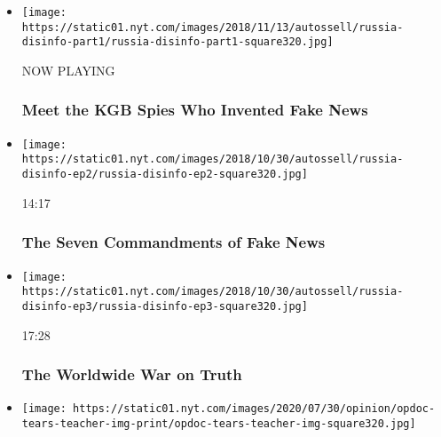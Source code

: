 \begin{itemize}
\item
  \texttt{[image: https://static01.nyt.com/images/2018/11/13/autossell/russia-disinfo-part1/russia-disinfo-part1-square320.jpg]}

  NOW PLAYING

  \hypertarget{meet-the-kgb-spies-who-invented-fake-news-2}{%
  \subsubsection{Meet the KGB Spies Who Invented Fake
  News}\label{meet-the-kgb-spies-who-invented-fake-news-2}}
\item
  \href{https://www.nytimes.com/video/opinion/100000006188102/what-is-pizzagate.html?action=click\&module=video-series-bar\&region=header\&pgtype=Article\&playlistId=video/opinion}{}

  \texttt{[image: https://static01.nyt.com/images/2018/10/30/autossell/russia-disinfo-ep2/russia-disinfo-ep2-square320.jpg]}

  14:17

  \hypertarget{the-seven-commandments-of-fake-news}{%
  \subsubsection{The Seven Commandments of Fake
  News}\label{the-seven-commandments-of-fake-news}}
\item
  \href{https://www.nytimes.com/video/opinion/100000006188105/countering-disinformation-active-measures.html?action=click\&module=video-series-bar\&region=header\&pgtype=Article\&playlistId=video/opinion}{}

  \texttt{[image: https://static01.nyt.com/images/2018/10/30/autossell/russia-disinfo-ep3/russia-disinfo-ep3-square320.jpg]}

  17:28

  \hypertarget{the-worldwide-war-on-truth}{%
  \subsubsection{The Worldwide War on
  Truth}\label{the-worldwide-war-on-truth}}
\item
  \href{https://www.nytimes.com/video/opinion/100000007247238/tears-teacher.html?action=click\&module=video-series-bar\&region=header\&pgtype=Article\&playlistId=video/opinion}{}

  \texttt{[image: https://static01.nyt.com/images/2020/07/30/opinion/opdoc-tears-teacher-img-print/opdoc-tears-teacher-img-square320.jpg]}


\end{itemize}
